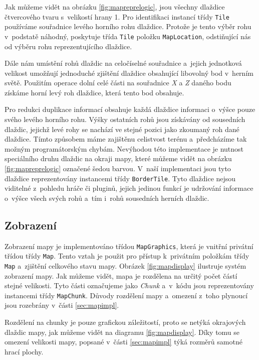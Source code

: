 Jak můžeme vidět na obrázku \ref{fig:mapreprelogic}, jsou všechny dlaždice čtvercového tvaru s~velikostí hrany 1. Pro identifikaci instancí třídy \texttt{Tile} používáme souřadnice levého horního rohu dlaždice. Protože je tento výběr rohu v~podstatě náhodný, poskytuje třída \texttt{Tile} položku \texttt{MapLocation}, odstiňující nás od výběru rohu reprezentujícího dlaždice.

Dále nám umístění rohů dlaždic na celočíselné souřadnice a~jejich jednotková velikost umožňují jednoduché zjištění dlaždice obsahující libovolný bod v~herním světě. Použitím operace dolní celé části na souřadnice \textit{X} a \textit{Z} daného bodu získáme horní levý roh dlaždice, která tento bod obsahuje.

Pro redukci duplikace informací obsahuje každá dlaždice informaci o~výšce pouze svého levého horního rohu. Výšky ostatních rohů jsou získávány od sousedních dlaždic, jejichž levé rohy se nachází ve stejné pozici jako zkoumaný roh dané dlaždice. Tímto způsobem máme zajištěnu celistvost terénu a~předcházíme tak možným programátorským chybám. Nevýhodou této implementace je nutnost speciálního druhu dlaždic na okraji mapy, které můžeme vidět na obrázku \ref{fig:mapreprelogic} označené šedou barvou. V~naší implementaci jsou tyto dlaždice reprezentovány instancemi třídy \texttt{BorderTile}. Tyto dlaždice nejsou viditelné z~pohledu hráče či pluginů, jejich jedinou funkcí je udržování informace o~výšce všech svých rohů a~tím i~rohů sousedních herních dlaždic. 


\subsection{Zobrazení}
Zobrazení mapy je implementováno třídou \texttt{MapGraphics}, která je vnitřní privátní třídou třídy \texttt{Map}. Tento vztah je použit pro přístup k~privátním položkám třídy \texttt{Map} a~zjištění celkového stavu mapy. Obrázek \ref{fig:mapdisplay} ilustruje systém zobrazení mapy. Jak můžeme vidět, mapa je rozdělena na určitý počet částí stejné velikosti. Tyto části označujeme jako \textit{Chunk} a~v~kódu jsou reprezentovány instancemi třídy \texttt{MapChunk}. Důvody rozdělení mapy a~omezení z~toho plynoucí jsou rozebrány v~části \ref{sec:mapimpl}. 

Rozdělení na chunky je pouze grafickou záležitostí, proto se netýká okrajových dlaždic mapy, jak můžeme vidět na diagramu \ref{fig:mapdisplay}. Díky tomu se omezení velikosti mapy, popsané v~části \ref{sec:mapimpl} týká rozměrů samotné hrací plochy.

